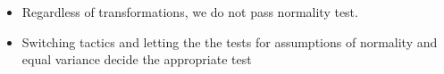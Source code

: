 \documentclass[11pt]{article}
\providecommand{\tightlist}{%
      \setlength{\itemsep}{0pt}\setlength{\parskip}{0pt}}
\begin{document}
\begin{itemize}
\tightlist
\item
  Regardless of transformations, we do not pass normality test.
\item
  Switching tactics and letting the the tests for assumptions of
  normality and equal variance decide the appropriate test
\end{itemize}


    
    
    
    
\end{document}
